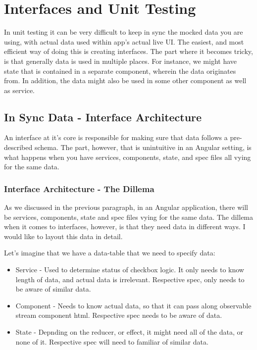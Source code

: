 \maketitle{}
\section{ Interfaces and Unit Testing }
In unit testing it can be very difficult to keep in sync the mocked data you
are using, with actual data used within app's actual live UI. The easiest, and
most efficient way of doing this is creating interfaces. The part where it
becomes tricky, is that generally data is used in multiple places. For instance,
we might have state that is contained in a separate component, wherein the data
originates from. In addition, the data might also be used in some other component
as well as service.

\subsection{ In Sync Data - Interface Architecture }
An interface at it's core is responsible for making sure that data follows a
pre-described schema. The part, however, that is unintuitive in an Angular
setting, is what happens when you have services, components, state, and spec
files all vying for the same data.

\subsubsection{ Interface Architecture - The Dillema }
As we discussed in the previous paragraph, in an Angular application, there will
be services, components, state and spec files vying for the same data. The
dillema when it comes to interfaces, however, is that they need data in
different ways. I would like to layout this data in detail.

Let's imagine that we have a data-table that we need to specify data:
\begin{itemize}
  \item Service - Used to determine status of checkbox logic. It only needs to
  know length of data, and actual data is irrelevant. Respective spec, only
  needs to be aware of similar data.
  \item Component - Needs to know actual data, so that it can pass along
  observable stream component html. Respective spec needs to be aware of data.
  \item State - Depnding on the reducer, or effect, it might need all of the
  data, or none of it. Respective spec will need to familiar of similar data.
\end{itemize}

